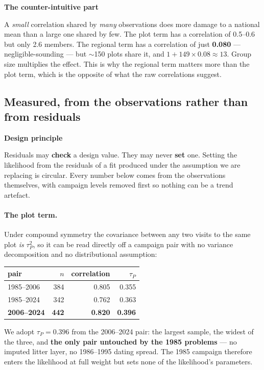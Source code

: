 \documentclass[11pt]{article}
\newenvironment{keybox}[1][]{%
  \begin{leftbar}\noindent\textbf{\small #1}\par\vspace{0.3em}\small}{\end{leftbar}}
\begin{document}
\begin{keybox}[The counter-intuitive part]
A \emph{small} correlation shared by \emph{many} observations does more damage to a
national mean than a large one shared by few. The plot term has a correlation of
0.5--0.6 but only 2.6 members. The regional term has a correlation of just
\textbf{0.080} --- negligible-sounding --- but $\sim$150 plots share it, and
$1+149\times0.08 \approx 13$. Group size multiplies the effect. This is why the
regional term matters more than the plot term, which is the opposite of what the
raw correlations suggest.
\end{keybox}

\subsection{Measured, from the observations rather than from residuals}

\begin{keybox}[Design principle]
Residuals may \textbf{check} a design value. They may never \textbf{set} one.
Setting the likelihood from the residuals of a fit produced under the assumption we
are replacing is circular. Every number below comes from the observations
themselves, with campaign levels removed first so nothing can be a trend artefact.
\end{keybox}

\paragraph{The plot term.} Under compound symmetry the covariance between any two
visits to the same plot \emph{is} $\tau_P^2$, so it can be read directly off a
campaign pair with no variance decomposition and no distributional assumption:

\begin{center}
\begin{tabular}{lrrr}
\toprule
pair & $n$ & correlation & $\tau_P$ \\
\midrule
1985--2006 & 384 & 0.805 & 0.355 \\
1985--2024 & 342 & 0.762 & 0.363 \\
\textbf{2006--2024} & \textbf{442} & \textbf{0.820} & \textbf{0.396} \\
\bottomrule
\end{tabular}
\end{center}

We adopt $\tau_P = 0.396$ from the 2006--2024 pair: the largest sample, the widest
of the three, and \textbf{the only pair untouched by the 1985 problems} --- no
imputed litter layer, no 1986--1995 dating spread. The 1985 campaign therefore
enters the likelihood at full weight but sets none of the likelihood's parameters.
\end{document}
